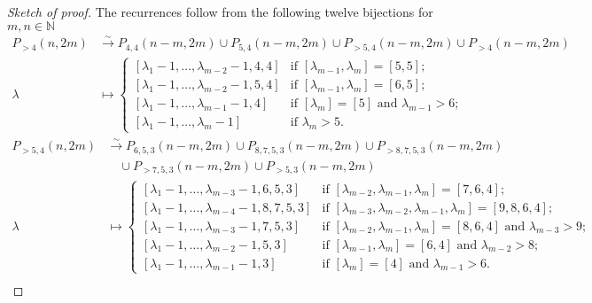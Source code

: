 \documentclass[a4paper, 12pt, reqno]{amsart}
\theoremstyle{remark}
\begin{document}
\begin{proof}[Sketch of proof]
  The recurrences follow from the following twelve bijections for $m, n \in \mathbb{N}$
  \begin{align*}
    P_{>4}(n, 2m) &\xrightarrow{\sim} P_{4, 4}(n - m, 2m) \cup P_{5, 4}(n - m, 2m) \cup P_{>5, 4}(n - m, 2m) \cup P_{>4}(n - m, 2m) \\
    \lambda &\mapsto
              \begin{cases}
                [\lambda_1 - 1, \dots, \lambda_{m - 2} - 1, 4, 4] &\text{if }[\lambda_{m - 1}, \lambda_m] = [5, 5]; \\
                [\lambda_1 - 1, \dots, \lambda_{m - 2} - 1, 5, 4] &\text{if }[\lambda_{m - 1}, \lambda_m] = [6, 5]; \\
                [\lambda_1 - 1, \dots, \lambda_{m - 1} - 1, 4] &\text{if }[\lambda_m] = [5]\text{ and }\lambda_{m - 1} > 6; \\
                [\lambda_1 - 1, \dots, \lambda_m - 1] &\text{if }\lambda_m > 5.
              \end{cases}
  \end{align*}
  \begin{align*}
    P_{>5, 4}(n, 2m) &\xrightarrow{\sim} P_{6, 5, 3}(n - m, 2m) \cup P_{8, 7, 5, 3}(n - m, 2m) \cup P_{>8, 7, 5, 3}(n - m, 2m)\\
    &\quad \cup P_{>7, 5, 3}(n - m, 2m) \cup P_{>5, 3}(n - m, 2m) \\
    \lambda &\mapsto
              \begin{cases}
                [\lambda_1 - 1, \dots, \lambda_{m - 3} - 1, 6, 5, 3] &\text{if }[\lambda_{m - 2}, \lambda_{m - 1}, \lambda_m] = [7, 6, 4]; \\
                [\lambda_1 - 1, \dots, \lambda_{m - 4} - 1, 8, 7, 5, 3] &\text{if }[\lambda_{m - 3}, \lambda_{m - 2}, \lambda_{m - 1}, \lambda_m] = [9, 8, 6, 4]; \\
                [\lambda_1 - 1, \dots, \lambda_{m - 3} - 1, 7, 5, 3] &\text{if }[\lambda_{m - 2}, \lambda_{m - 1}, \lambda_m] = [8, 6, 4]\text{ and }\lambda_{m - 3} > 9; \\
                [\lambda_1 - 1, \dots, \lambda_{m - 2} - 1, 5, 3] &\text{if }[\lambda_{m - 1}, \lambda_m] = [6, 4]\text{ and }\lambda_{m - 2} > 8; \\
                [\lambda_1 - 1, \dots, \lambda_{m - 1} -1, 3] &\text{if }[\lambda_m] = [4]\text{ and }\lambda_{m - 1} > 6.
              \end{cases}
  \end{align*}
  \begin{align*}

\end{align*}
\end{proof}
\end{document}
